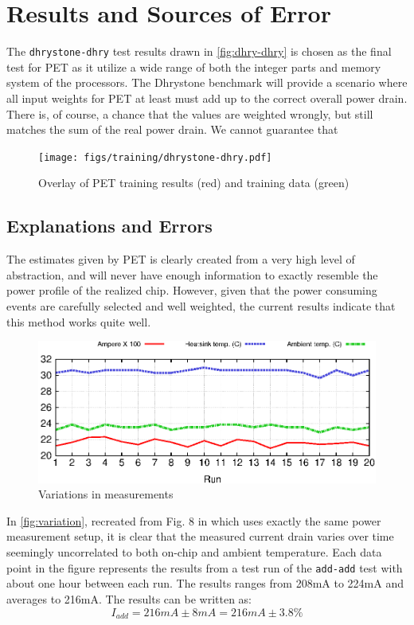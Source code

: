 \section{Results and Sources of Error}

The \texttt{dhrystone-dhry} test results drawn in \autoref{fig:dhry-dhry}
is chosen as the final test for PET as it utilize a wide range of both the
integer parts and memory system of the processors. The Dhrystone benchmark will
provide a scenario where all input weights for PET at least must add up to the correct
overall power drain. There is, of course, a chance that the values are weighted wrongly, but
still matches the sum of the real power drain. We cannot guarantee that 


\begin{figure}[ht]
\centering
\texttt{[image: figs/training/dhrystone-dhry.pdf]}
\caption{Overlay of PET training results (red) and training data (green)}
\label{fig:dhry-training}
\end{figure}

\subsection{Explanations and Errors}
The estimates given by PET is clearly created from a very high level of abstraction,
and will never have enough information to exactly resemble the power profile of
the realized chip. However, given that the power consuming events are carefully
selected and well weighted, the current results indicate that this method works quite well.

\begin{figure}[ht]
    \includegraphics{figs/heat}
    \caption{Variations in measurements}
    \label{fig:variation}
\end{figure}

In \autoref{fig:variation}, recreated from Fig. 8 in \cite{rundehvatum2013exploring} which uses exactly the
same power measurement setup, it is clear that the measured current drain varies over
time seemingly uncorrelated to both on-chip and ambient temperature. Each data point
in the figure represents the results from a test run of the \texttt{add-add} test with
about one hour between each run. The results ranges from 208mA to 224mA and averages to 216mA.
The results can be written as:
\[I_{add} = 216mA\pm8mA = 216mA\pm3.8\%\]

